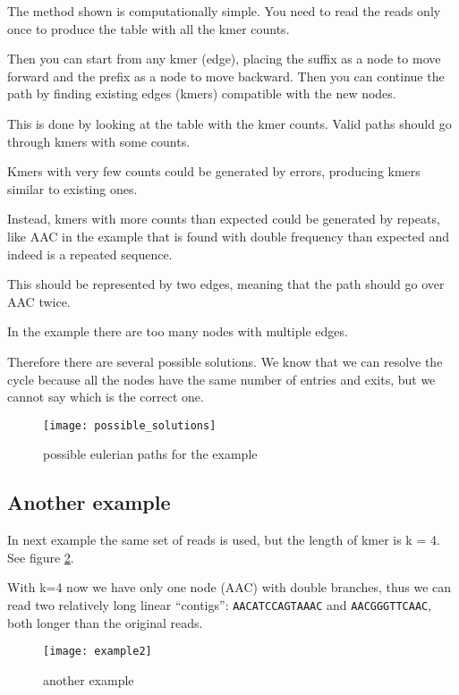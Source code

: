 The method shown is computationally simple.
You need to read the reads only once to produce the table with all the kmer
counts.

Then you can start from any kmer (edge), placing the suffix as a node to
move forward and the prefix as a node to move backward.
Then you can continue the path by finding existing  edges (kmers)
compatible with the new nodes.

This is done by looking at the table with the kmer counts.
Valid paths should go through kmers with some counts.

Kmers with very few counts could be generated by errors, producing kmers
similar to existing ones.

Instead, kmers with more counts than expected could be generated by
repeats, like AAC in the example that is found with double frequency than
expected and indeed is a repeated sequence.

This should be represented by two edges, meaning that the path should go over
AAC twice.

In the example there are too many nodes with multiple edges.

Therefore there are several possible solutions.
We know that we can resolve the cycle because all the nodes have the 
same number of entries and exits, but we cannot say which is the correct one.

\begin{figure}[H]
  \centering
  \texttt{[image: possible\_solutions]}
  \caption{possible eulerian paths for the example}
  \label{fig:possible_solutions}
\end{figure}

\subsection{Another example}

In next example the same set of reads is used, but the length of kmer is
k = 4. See figure \ref{fig:example2}.

With k=4 now we have only one node (AAC) with double branches, 
thus we can read two relatively long linear “contigs”: 
\texttt{AACATCCAGTAAAC} and \texttt{AACGGGTTCAAC}, both longer than the
original reads. 

\begin{figure}[H]
  \centering
  \texttt{[image: example2]}
  \caption{another example}
  \label{fig:example2}
\end{figure}

